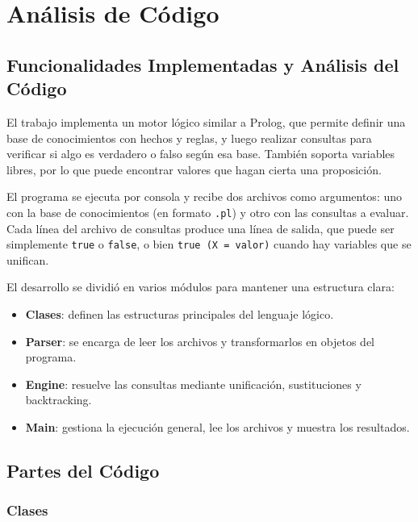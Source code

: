 \section{Análisis de Código}

\subsection{Funcionalidades Implementadas y Análisis del Código}

El trabajo implementa un motor lógico similar a Prolog, que permite definir una base de conocimientos con hechos y reglas, y luego realizar consultas para verificar si algo es verdadero o falso según esa base.  
También soporta variables libres, por lo que puede encontrar valores que hagan cierta una proposición.  

El programa se ejecuta por consola y recibe dos archivos como argumentos: uno con la base de conocimientos (en formato \texttt{.pl}) y otro con las consultas a evaluar.  
Cada línea del archivo de consultas produce una línea de salida, que puede ser simplemente \texttt{true} o \texttt{false}, o bien \texttt{true (X = valor)} cuando hay variables que se unifican.  

El desarrollo se dividió en varios módulos para mantener una estructura clara:
\begin{itemize}
  \item \textbf{Clases}: definen las estructuras principales del lenguaje lógico.
  \item \textbf{Parser}: se encarga de leer los archivos y transformarlos en objetos del programa.
  \item \textbf{Engine}: resuelve las consultas mediante unificación, sustituciones y backtracking.
  \item \textbf{Main}: gestiona la ejecución general, lee los archivos y muestra los resultados.
\end{itemize}

\subsection{Partes del Código}

\subsubsection{Clases}

